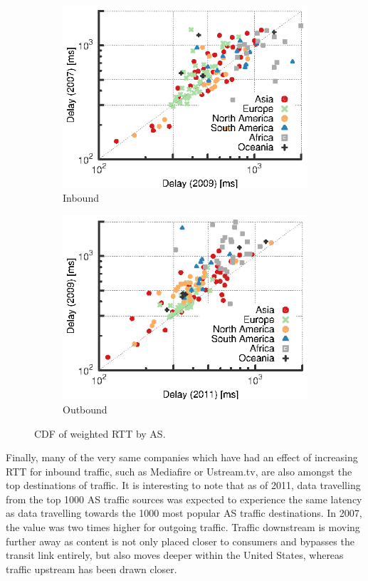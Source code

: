 \begin{figure}
    \centering
    \begin{subfigure}[b]{0.5\linewidth}
        \includegraphics{figures/malawi/rtt_comp_07_09}
        \caption{Inbound}
    \end{subfigure}%
    \begin{subfigure}[b]{0.5\linewidth}
        \includegraphics{figures/malawi/rtt_comp_09_11}
        \caption{Outbound}
    \end{subfigure}%
    \caption{CDF of weighted RTT by AS. \label{fig:rtt_comp}}
\end{figure}

Finally, many of the very same companies which have had an effect of increasing \ac{RTT} for inbound traffic, such as Mediafire or Ustream.tv, are also amongst the top destinations of traffic. 
It is interesting to note that as of 2011, data travelling from the top 1000 \ac{AS} traffic sources was expected to experience the same latency as data travelling towards the 1000 most popular \ac{AS} traffic destinations. 
In 2007, the value was two times higher for outgoing traffic.
Traffic downstream is moving further away as content is not only placed closer to consumers and bypasses the transit link entirely, but also moves deeper within the United States, whereas traffic upstream has been drawn closer. 

